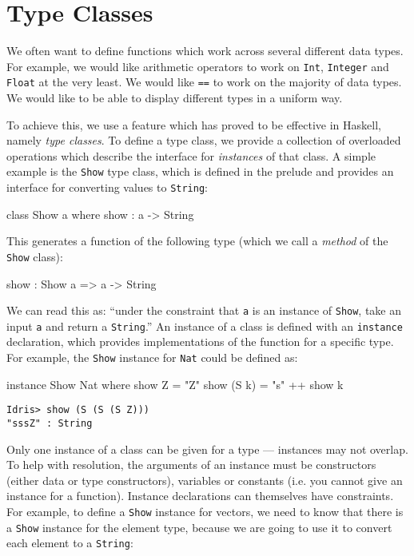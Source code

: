 \section{Type Classes}
\label{sec:classes}

We often want to define functions which work across several different data types.
For example, we would like arithmetic operators to work on \texttt{Int}, \texttt{Integer} and \texttt{Float} at the very least.
We would like \texttt{==} to work on the majority of data types.
We would like to be able to display different types in a uniform way.

To achieve this, we use a feature which has proved to be effective in Haskell, namely \emph{type classes}.
To define a type class, we provide a collection of overloaded operations which describe the interface for \emph{instances} of that class.
A simple example is the \texttt{Show} type class, which is defined in the prelude and provides an interface for converting values to \texttt{String}:

\begin{code}
class Show a where
    show : a -> String
\end{code}

\noindent
This generates a function of the following type (which we call a \emph{method} of the  \texttt{Show} class):

\begin{code}
show : Show a => a -> String
\end{code}

\noindent
We can read this as: ``under the constraint that \texttt{a} is an instance of \texttt{Show}, take an input \texttt{a} and return a \texttt{String}.''
An instance of a class is defined with an \texttt{instance} declaration, which provides implementations of the function for a specific type.
For example, the \texttt{Show} instance for \texttt{Nat} could be defined as:

\begin{code}
instance Show Nat where
    show Z = "Z"
    show (S k) = "s" ++ show k
\end{code}

\begin{lstlisting}[style=stdout]
Idris> show (S (S (S Z)))
"sssZ" : String
\end{lstlisting}

\noindent
Only one instance of a class can be given for a type --- instances may not overlap.
To help with resolution, the arguments of an instance must be constructors
(either data or type constructors), variables or constants (i.e. you cannot
give an instance for a function).
Instance declarations can themselves have constraints.
For example, to define a \texttt{Show} instance for vectors, we need to know that there is a \texttt{Show}  instance for the element type, because we are going to use it to convert each element to a \texttt{String}:

